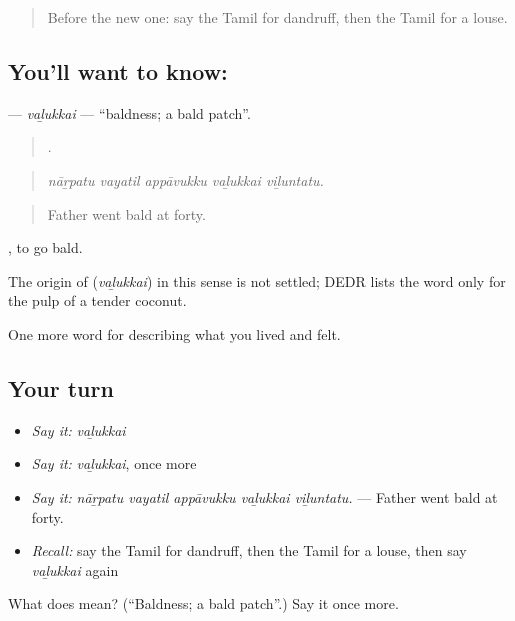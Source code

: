 \begin{quote}
Before the new one: say the Tamil for dandruff, then the Tamil for a louse.
\end{quote}

\subsection*{You'll want to know: }
\textbf{} — \emph{vaḻukkai} — \textquotedblleft{}baldness; a bald patch\textquotedblright{}.

\begin{quote}
    .
\end{quote}

\begin{quote}
\emph{nāṟpatu vayatil appāvukku vaḻukkai viḻuntatu.}
\end{quote}

\begin{quote}
Father went bald at forty.
\end{quote}

 , to go bald.

\begin{cousinweb}
The origin of \textbf{} (\emph{vaḻukkai}) in this sense is not settled; DEDR lists the word only for the pulp of a tender coconut.
\end{cousinweb}

\begin{grammarlens}[title={What you've built}]
One more word for describing what you lived and felt.
\end{grammarlens}

\subsection*{Your turn}
\begin{itemize}
\raggedright
  \item \emph{Say it:} \emph{vaḻukkai}
  \item \emph{Say it:} \emph{vaḻukkai}, once more
  \item \emph{Say it:} \emph{nāṟpatu vayatil appāvukku vaḻukkai viḻuntatu.} — Father went bald at forty.
  \item \emph{Recall:} say the Tamil for dandruff, then the Tamil for a louse, then say \emph{vaḻukkai} again
\end{itemize}

\begin{tcolorbox}[breakable,colback=teal!4,colframe=teal!35!black,title={Before you move on}]
What does  mean? (\textquotedblleft{}Baldness; a bald patch\textquotedblright{}.) Say it once more.
\end{tcolorbox}
